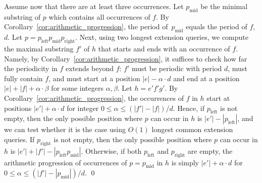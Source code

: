 Assume now that there are at least three occurrences. Let $p_{\text{mid}}$ be the minimal substring of $p$ which contains all occurrences of $f$. By Corollary~\ref{cor:arithmetic_progression}, the period of~$p_{\text{mid}}$ equals the period of $f$, $d$. Let $p=p_{\text{left}} p_{\text{mid}} p_{\text{right}}$. Next, using two longest extension queries, we compute the maximal substring $f'$ of $h$ that starts and ends with an occurrence of $f$. Namely, by Corollary~\ref{cor:arithmetic_progression}, it suffices to check how far the periodicity in $f$ extends beyond $f$: $f'$ must be periodic with period $d$, must fully contain $f$, and must start at a position $|e|-\alpha \cdot d$ and end at a position $|e|+|f|+\alpha \cdot \beta$ for some integers $\alpha, \beta$. Let $h = e'f'g'$. By Corollary~\ref{cor:arithmetic_progression}, the occurrences of $f$ in $h$ start at positions $|e'| + \alpha \cdot d$ for integer $0 \leq \alpha \leq (|f'|-|f|)/d$. Hence, if $p_{\text{left}}$ is not empty, then the only possible position where $p$ can occur in $h$ is $|e'|-|p_{\text{left}}|$, and we can test whether it is the case using $O(1)$ longest common extension queries. If $p_{\text{right}}$ is not empty, then the only possible position where $p$ can occur in $h$ is $|e'|+|f'|-|p_{\text{left}} p_{\text{mid}}|$. Otherwise, if both $p_{\text{left}}$ and $p_{\text{right}}$ are empty, the arithmetic progression of occurrences of $p=p_{\text{mid}}$ in $h$ is simply $|e'|+\alpha \cdot d$ for $0 \leq \alpha \leq (|f'|-|p_{\text{mid}}|)/d$. 
\qed